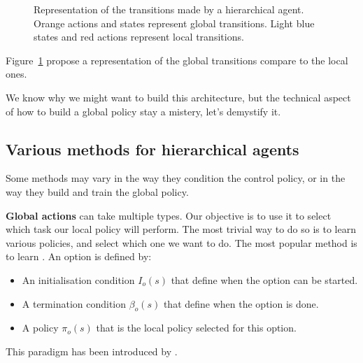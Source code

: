 \begin{figure}
    \caption{Representation of the transitions made by a hierarchical agent. Orange actions and states represent global
    transitions. Light blue states and red actions represent local transitions.}
    \label{figure:bg:plan-rl:hierarchical-transitions}
\end{figure}


Figure~\ref{figure:bg:plan-rl:hierarchical-transitions} propose a representation of the global transitions compare to
the local ones.

We know why we might want to build this architecture, but the technical aspect of how to build a global policy stay a
mistery, let's demystify it.

\subsection{Various methods for hierarchical agents}\label{subsection:bg:plan-rl:global-actions}

Some methods may vary in the way they condition the control policy, or in the way they build and train the global
policy.

\textbf{Global actions} can take multiple types.
Our objective is to use it to select which task our local policy will perform.
The most trivial way to do so is to learn various policies, and select which one we want to do.
The most popular method is to learn .
An option is defined by:
\begin{itemize}
    \item An initialisation condition $I_o(s)$ that define when the option can be started.
    \item A termination condition $\beta_o(s)$ that define when the option is done.
    \item A policy $\pi_o(s)$ that is the local policy selected for this option.
\end{itemize}
This paradigm has been introduced by \citet{sutton1999between}.

